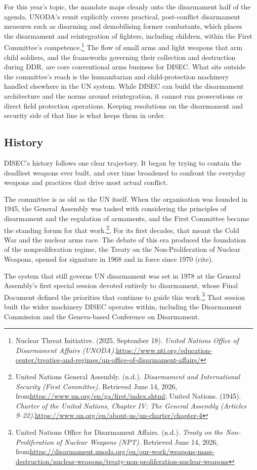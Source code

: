 For this year’s topic, the mandate maps cleanly onto the disarmament half of the agenda. UNODA’s remit explicitly covers practical, post-conflict disarmament measures such as disarming and demobilising former combatants, which places the disarmament and reintegration of fighters, including children, within the First Committee’s competence.\footnote{Nuclear Threat Initiative. (2025, September 18). \emph{United Nations Office of Disarmament Affairs (UNODA).}\url{https://www.nti.org/education-center/treaties-and-regimes/un-office-of-disarmament-affairs/}} The flow of small arms and light weapons that arm child soldiers, and the frameworks governing their collection and destruction during DDR, are core conventional arms business for DISEC. What sits outside the committee's reach is the humanitarian and child-protection machinery handled elsewhere in the UN system. While DISEC can build the disarmament architecture and the norms around reintegration, it cannot run prosecutions or direct field protection operations. Keeping resolutions on the disarmament and security side of that line is what keeps them in order.

\subsection{History}

DISEC’s history follows one clear trajectory. It began by trying to contain the deadliest weapons ever built, and over time broadened to confront the everyday weapons and practices that drive most actual conflict.

The committee is as old as the UN itself. When the organisation was founded in 1945, the General Assembly was tasked with considering the principles of disarmament and the regulation of armaments, and the First Committee became the standing forum for that work.\footnote{United Nations General Assembly. (n.d.). \emph{Disarmament and International Security (First Committee).} Retrieved June 14, 2026, from\url{https://www.un.org/en/ga/first/index.shtml}; United Nations. (1945). \emph{Charter of the United Nations, Chapter IV: The General Assembly (Articles 9–22).}\url{https://www.un.org/en/about-us/un-charter/chapter-4}}, For its first decades, that meant the Cold War and the nuclear arms race. The debate of this era produced the foundation of the nonproliferation regime, the Treaty on the Non-Proliferation of Nuclear Weapons, opened for signature in 1968 and in force since 1970 (cite).

The system that still governs UN disarmament was set in 1978 at the General Assembly’s first special session devoted entirely to disarmament, whose Final Document defined the priorities that continue to guide this work.\footnote{United Nations Office for Disarmament Affairs. (n.d.). \emph{Treaty on the Non-Proliferation of Nuclear Weapons (NPT).} Retrieved June 14, 2026, from\url{https://disarmament.unoda.org/en/our-work/weapons-mass-destruction/nuclear-weapons/treaty-non-proliferation-nuclear-weapons}} That session built the wider machinery DISEC operates within, including the Disarmament Commission and the Geneva-based Conference on Disarmament.

